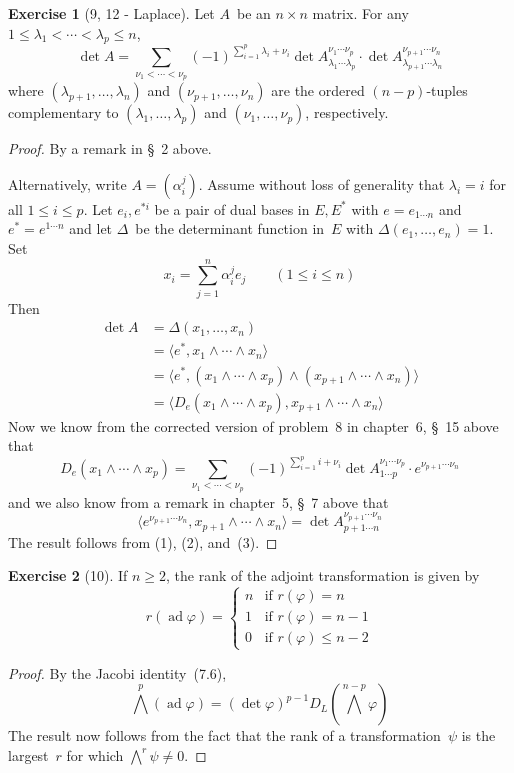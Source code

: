 \documentclass[letterpaper,12pt]{article}
\DeclareMathOperator{\ad}{ad}
\newcommand{\mult}{\cdot}
\newcommand{\eprod}{\wedge}
\newcommand{\bigeprod}{\bigwedge}
\newcommand{\medeprod}{{\textstyle\bigeprod}}
\newcommand{\sprod}[2]{\langle#1,#2\rangle}
\newcommand{\multi}[4]{#2_{#3}#1\cdots#1#2_{#4}}
\newcommand{\eprods}[3]{\multi{\eprod}{#1}{#2}{#3}}
\theoremstyle{definition}
\newtheorem*{exer}{Exercise}
\theoremstyle{remark}
\begin{document}
\begin{exer}[9, 12 - Laplace]
Let \(A\)~be an \(n\times n\) matrix. For any \(1\le\lambda_1<\cdots<\lambda_p\le n\),
\[\det A=\sum_{\nu_1<\cdots<\nu_p}(-1)^{\sum_{i=1}^p\lambda_i+\nu_i}\det A_{\lambda_1\cdots\lambda_p}^{\nu_1\cdots\nu_p}\mult\det A_{\lambda_{p+1}\cdots\lambda_n}^{\nu_{p+1}\cdots\nu_n}\]
where \((\lambda_{p+1},\ldots,\lambda_n)\) and \((\nu_{p+1},\ldots,\nu_n)\) are the ordered \((n-p)\)-tuples complementary to \((\lambda_1,\ldots,\lambda_p)\) and \((\nu_1,\ldots,\nu_p)\), respectively.
\end{exer}
\begin{proof}
By a remark in \S~2 above.

Alternatively, write \(A=(\alpha_i^j)\). Assume without loss of generality that \(\lambda_i=i\) for all \(1\le i\le p\). Let \(e_i,e^{*i}\) be a pair of dual bases in \(E,E^*\) with \(e=e_{1\cdots n}\) and \(e^*=e^{1\cdots n}\) and let \(\Delta\)~be the determinant function in~\(E\) with \(\Delta(e_1,\ldots,e_n)=1\). Set
\[x_i=\sum_{j=1}^n\alpha_i^je_j\qquad(1\le i\le n)\]
Then
\begin{align*}
\det A&=\Delta(x_1,\ldots,x_n)\\
	&=\sprod{e^*}{\eprods{x}{1}{n}}\\
	&=\sprod{e^*}{(\eprods{x}{1}{p})\eprod(\eprods{x}{p+1}{n})}\\
	&=\sprod{D_e(\eprods{x}{1}{p})}{\eprods{x}{p+1}{n}}\tag{1}
\end{align*}
Now we know from the corrected version of problem~8 in chapter~6, \S~15 above that
\[D_e(\eprods{x}{1}{p})=\sum_{\nu_1<\cdots<\nu_p}(-1)^{\sum_{i=1}^pi+\nu_i}\det A_{1\cdots p}^{\nu_1\cdots\nu_p}\mult e^{\nu_{p+1}\cdots\nu_n}\tag{2}\]
and we also know from a remark in chapter~5, \S~7 above that
\[\sprod{e^{\nu_{p+1}\cdots\nu_n}}{\eprods{x}{p+1}{n}}=\det A_{p+1\cdots n}^{\nu_{p+1}\cdots\nu_n}\tag{3}\]
The result follows from (1), (2), and~(3).
\end{proof}

\begin{exer}[10]
If \(n\ge 2\), the rank of the adjoint transformation is given by
\[r(\ad\varphi)=\begin{cases}
n&\text{if }r(\varphi)=n\\
1&\text{if }r(\varphi)=n-1\\
0&\text{if }r(\varphi)\le n-2
\end{cases}\]
\end{exer}
\begin{proof}
By the Jacobi identity~(7.6),
\[\medeprod^p(\ad\varphi)=(\det\varphi)^{p-1}D_L(\medeprod^{n-p}\varphi)\]
The result now follows from the fact that the rank of a transformation~\(\psi\) is the largest~\(r\) for which \(\medeprod^r\psi\ne0\).
\end{proof}
\end{document}
